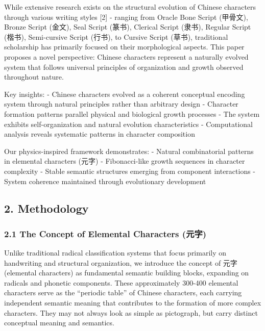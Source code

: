 \documentclass[
  11pt,
  letterpaper,
]{article}
\begin{document}
While extensive research exists on the structural evolution of Chinese
characters through various writing styles {[}2{]} - ranging from Oracle
Bone Script (甲骨文), Bronze Script (金文), Seal Script (篆书), Clerical
Script (隶书), Regular Script (楷书), Semi-cursive Script (行书), to
Cursive Script (草书), traditional scholarship has primarily focused on
their morphological aspects. This paper proposes a novel perspective:
Chinese characters represent a naturally evolved system that follows
universal principles of organization and growth observed throughout
nature.

Key insights: - Chinese characters evolved as a coherent conceptual
encoding system through natural principles rather than arbitrary design
- Character formation patterns parallel physical and biological growth
processes - The system exhibits self-organization and natural evolution
characteristics - Computational analysis reveals systematic patterns in
character composition

Our physics-inspired framework demonstrates: - Natural combinatorial
patterns in elemental characters (元字) - Fibonacci-like growth
sequences in character complexity - Stable semantic structures emerging
from component interactions - System coherence maintained through
evolutionary development

\hypertarget{methodology}{%
\subsection{2. Methodology}\label{methodology}}

\hypertarget{the-concept-of-elemental-characters-ux5143ux5b57}{%
\subsubsection{2.1 The Concept of Elemental Characters
(元字)}\label{the-concept-of-elemental-characters-ux5143ux5b57}}

Unlike traditional radical classification systems that focus primarily
on handwriting and structural organization, we introduce the concept of
元字 (elemental characters) as fundamental semantic building blocks,
expanding on radicals and phonetic components. These approximately
300-400 elemental characters serve as the ``periodic table'' of Chinese
characters, each carrying independent semantic meaning that contributes
to the formation of more complex characters. They may not always look as
simple as pictograph, but carry distinct conceptual meaning and
semantics.
\end{document}

